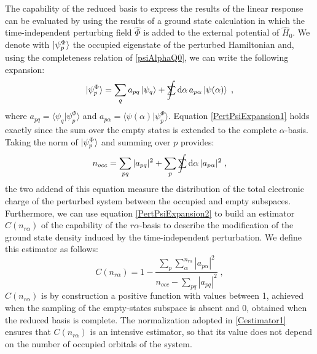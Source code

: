 \documentclass[a4paper]{article}
\newcommand{\dd}{{\rm d}}
\newcommand{\sint}{\mathrlap{\displaystyle\int}
\mathrlap{\textstyle\sum}
\phantom{\mathrlap{\displaystyle
\int}\textstyle\sum}}
\newcommand{\be}{\begin{equation}}
\newcommand{\ee}{\end{equation}}
\newcommand{\qq}{\qquad}
\newcommand{\lb}{\label}
\newcommand{\op}[1]{\hat {#1}}
\newcommand{\brket}[2]{\langle  #1 | #2 \rangle} %
\newcommand{\hnot}{\op{H}_0}
\begin{document}
The capability of the reduced basis to express the results of the linear response can be evaluated by using the results of a ground state calculation in which the time-independent 
perturbing field $\op\Phi$ is added to the external potential of $\hnot$. We denote with $\ket{\psi_p^\Phi}$ the occupied eigenstate of the perturbed Hamiltonian and, using the 
completeness relation of \eqref{psiAlphaQ0}, we can write the following expansion:
\be\lb{PertPsiExpansion1}
\ket{\psi_p^{\Phi}} = \sum_q a_{pq}\ket{\psi_q} + \sint\dd\alpha \,a_{p\alpha}\ket{\psi(\alpha)} \;,
\ee
where $a_{pq} = \brket{\psi_q}{\psi_p^{\Phi}}$ and $a_{p\alpha} = \brket{\psi(\alpha)}{\psi_p^{\Phi}}$. Equation \eqref{PertPsiExpansion1} holds exactly since the sum over the empty states
is extended to the complete $\alpha$-basis. Taking the norm of $\ket{\psi_p^\Phi}$ and summing over $p$ provides:
\be\lb{PertPsiExpansion2}
n_{occ} = \sum_{pq} |a_{pq}|^2 + \sum_p\sint\dd\alpha\,|a_{p\alpha}|^2 \;,
\ee
the two addend of this equation measure the distribution of the total electronic charge of the perturbed system between the occupied and empty subspaces. Furthermore, we can use
equation \eqref{PertPsiExpansion2} to build an estimator $C(n_{r\alpha})$ of the capability of the $r\alpha$-basis to describe the modification of the ground state density induced 
by the time-independent perturbation. We define this estimator as follows:
\be\lb{Cestimator1}
C(n_{r\alpha}) = 1 - \frac{\sum_p\sum_\alpha^{n_{r\alpha}}|a_{p\alpha}|^2}{n_{occ} - \sum_{pq} |a_{pq}|^2} \;,
\ee
$C(n_{r\alpha})$ is by construction a positive function with values between 1, achieved when the sampling of the empty-states subspace is absent and 0, obtained when the reduced basis
is complete. The normalization adopted in \eqref{Cestimator1} ensures that $C(n_{r\alpha})$ is an intensive estimator, so that its value does not depend on the number of occupied
orbitals of the system. 


% 
\end{document}
